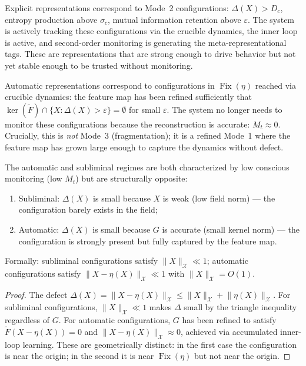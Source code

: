 \documentclass[12pt, oneside]{memoir}
\DeclareMathOperator{\Fix}{Fix}
\newcommand{\X}{\mathcal{X}}
\newcommand{\Ft}{\widetilde{F}}
\newcommand{\nnorm}[1]{\lVert #1 \rVert}
\begin{document}
Explicit representations correspond to Mode~2 configurations: $\Delta(X) > D_c$,
entropy production above $\sigma_c$, mutual information retention above $\varepsilon$.
The system is actively tracking these configurations via the crucible dynamics, the
inner loop is active, and second-order monitoring is generating the meta-representational
tags.  These are representations that are strong enough to drive behavior but not yet
stable enough to be trusted without monitoring.

Automatic representations correspond to configurations in $\Fix(\eta)$ reached via
crucible dynamics: the feature map has been refined sufficiently that $\ker(\Ft) \cap
\{X: \Delta(X) > \varepsilon\} = \emptyset$ for small $\varepsilon$.  The system no
longer needs to monitor these configurations because the reconstruction is accurate:
$M_t \approx 0$.  Crucially, this is \emph{not} Mode~3 (fragmentation); it is a refined
Mode~1 where the feature map has grown large enough to capture the dynamics without
defect.

\begin{proposition}
\label{prop:auto-subliminal}
The automatic and subliminal regimes are both characterized by low conscious monitoring
(low $M_t$) but are structurally opposite:
\begin{enumerate}
  \item Subliminal: $\Delta(X)$ is small because $X$ is weak (low field norm) — the
        configuration barely exists in the field;
  \item Automatic: $\Delta(X)$ is small because $G$ is accurate (small kernel norm) —
        the configuration is strongly present but fully captured by the feature map.
\end{enumerate}
Formally: subliminal configurations satisfy $\nnorm{X}_\X \ll 1$; automatic
configurations satisfy $\nnorm{X - \eta(X)}_\X \ll 1$ with $\nnorm{X}_\X = O(1)$.
\end{proposition}

\begin{proof}
The defect $\Delta(X) = \nnorm{X - \eta(X)}_\X \leq \nnorm{X}_\X + \nnorm{\eta(X)}_\X$.
For subliminal configurations, $\nnorm{X}_\X \ll 1$ makes $\Delta$ small by the triangle
inequality regardless of $G$.  For automatic configurations, $G$ has been refined to
satisfy $\Ft(X - \eta(X)) = 0$ and $\nnorm{X - \eta(X)}_\X \approx 0$, achieved via
accumulated inner-loop learning.  These are geometrically distinct: in the first case
the configuration is near the origin; in the second it is near $\Fix(\eta)$ but not near
the origin.
\end{proof}
\end{document}
